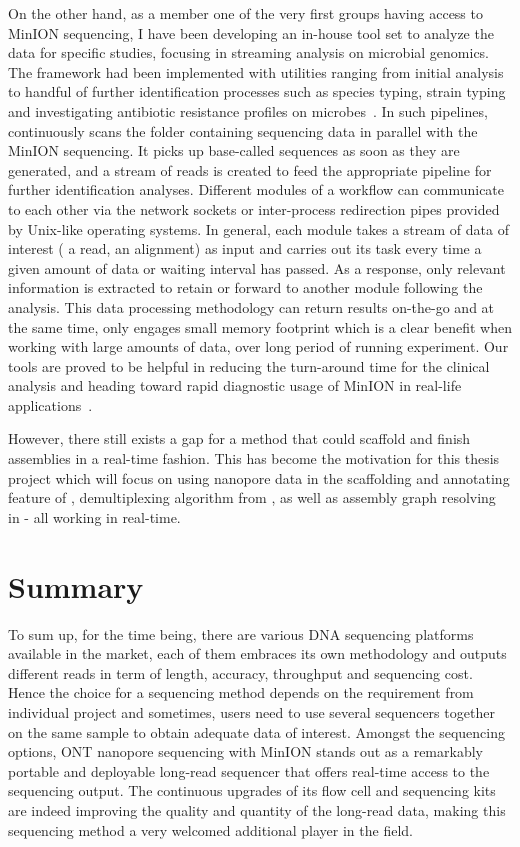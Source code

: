 On the other hand, as a member one of the very first groups having access to MinION sequencing, I have been developing an in-house tool set to analyze the data for specific studies, focusing in streaming analysis on microbial genomics.  
The framework had been implemented with utilities ranging from initial analysis to handful of further identification processes such as species typing, strain typing and investigating antibiotic resistance profiles on microbes~\cite{CaoGE2016}. In such pipelines, \npreader{}~\cite{CaoGC2016} continuously scans the folder containing sequencing data in parallel with the MinION sequencing. It picks up base-called sequences as soon as they are generated, and a stream of reads is created to feed the  appropriate pipeline for further identification analyses. 
Different modules of a workflow can communicate to each other via the network sockets or inter-process redirection pipes provided by Unix-like operating systems.
In general, each module takes a stream of data of interest (\EG{} a read, an alignment) as input and carries out its task every time a given amount of data or waiting interval has passed. As a response, only relevant information is extracted to retain or forward to another module following the analysis. 
This data processing methodology can return results on-the-go and at the same time, only engages small memory footprint which is a clear benefit when working with large amounts of data, over long period of running experiment.  
Our tools are proved to be helpful in reducing the turn-around time for the clinical analysis and heading toward rapid diagnostic usage of MinION in real-life applications~\cite{Bialasiewicz2018rapid}.

However, there still exists a gap for a method that could scaffold and finish assemblies in a real-time fashion.  %
This has become the motivation for this thesis project which will focus on using nanopore data in the scaffolding and annotating feature of \npscarf{}, demultiplexing algorithm from \npbarcode{}, as well as assembly graph resolving in \npgraph{} - all working in real-time.

\section{Summary}
To sum up, for the time being, there are various DNA sequencing platforms available in the market, each of them embraces its own methodology and outputs different reads in term of length, accuracy, throughput and sequencing cost. Hence the choice for a sequencing method depends on the requirement from individual project and sometimes, users need to use several sequencers together on the same sample to obtain adequate data of interest. 
Amongst the sequencing options, ONT nanopore sequencing with MinION stands out as a remarkably portable and deployable long-read sequencer that offers real-time access to the sequencing output. The continuous upgrades of its flow cell and sequencing kits are indeed improving the quality and quantity of the long-read data, making this sequencing method a very welcomed additional player in the field.

